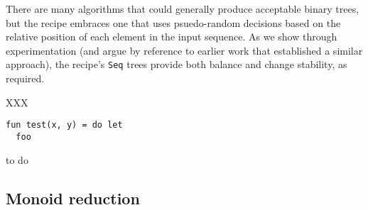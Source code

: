 \documentclass[11pt]{article}
\begin{document}
There are many algorithms that could generally produce acceptable
binary trees, but the recipe embraces one that uses psuedo-random
decisions based on the relative position of each element in the input
sequence.  As we show through experimentation (and argue by reference
to earlier work that established a similar approach), the recipe's
\texttt{Seq} trees provide both balance and change stability, as
required.

XXX

\begin{lstlisting}[style=AdaptonRecipeCode]
fun test(x, y) = do let
  foo
\end{lstlisting}


to do

\subsection{Monoid reduction}
\end{document}
